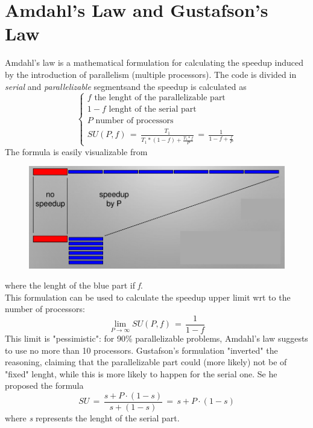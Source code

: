 \documentclass{article}
\begin{document}
	\section{Amdahl's Law and Gustafson's Law}
		Amdahl's law is a mathematical formulation for calculating the speedup induced by the introduction of parallelism (multiple processors). The code is divided in \textit{serial} and \textit{parallelizable} segmentsand the speedup is calculated as
		\begin{equation}
			\begin{cases}
				f \text{ the lenght of the parallelizable part}\\
				1-f \text{ lenght of the serial part}\\
				P \text{ number of processors}\\
				SU(P, f)\, =\, \frac{T_1}{T_1*(1-f)+\frac{T_1*f}{P}}\, =\, \frac{1}{1-f+\frac{f}{P}}
			\end{cases}
		\end{equation}
		The formula is easily visualizable from
		\begin{figure}[H]
			\centering
			\includegraphics[width = \textwidth]{./images/Amdahl1.png}
		\end{figure}
		where the lenght of the blue part if \emph{f}.\\
		This formulation can be used to calculate the speedup upper limit wrt to the number of processors:
		\begin{equation}
			\lim_{P \rightarrow \infty} SU(P, f)\, =\, \frac{1}{1-f}
		\end{equation}
		This limit is "pessimistic": for 90\% parallelizable problems, Amdahl's law suggests to use no more than 10 processors. Gustafson's formulation "inverted" the reasoning, claiming that the parallelizable part could (more likely) not be of "fixed" lenght, while this is more likely to happen for the serial one. Se he proposed the formula
		\begin{equation}
			SU\, =\, \frac{s + P\cdot(1-s)}{s + (1-s)}\, =\, s + P\cdot(1 - s)
		\end{equation}
		where \emph{s} represents the lenght of the serial part.
\end{document}
